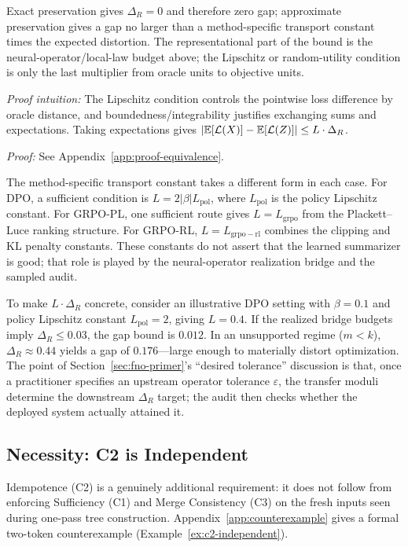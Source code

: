 \noindent Exact preservation gives $\Delta_R = 0$ and therefore zero gap; approximate preservation gives a gap no larger than a method-specific transport constant times the expected distortion. The representational part of the bound is the neural-operator/local-law budget above; the Lipschitz or random-utility condition is only the last multiplier from oracle units to objective units.

\noindent\textit{Proof intuition:} The Lipschitz condition controls the pointwise loss difference by oracle distance, and boundedness/integrability justifies exchanging sums and expectations. Taking expectations gives $|\mathbb{E}[\mathcal{L}(X)] - \mathbb{E}[\mathcal{L}(Z)]| \le L \cdot \Delta_R$.

\noindent\textit{Proof:} See Appendix~\ref{app:proof-equivalence}.

The method-specific transport constant takes a different form in each case. For DPO, a sufficient condition is $L = 2|\beta| L_{\mathrm{pol}}$, where $L_{\mathrm{pol}}$ is the policy Lipschitz constant. For GRPO-PL, one sufficient route gives $L = L_{\mathrm{grpo}}$ from the Plackett--Luce ranking structure. For GRPO-RL, $L = L_{\mathrm{grpo-rl}}$ combines the clipping and KL penalty constants. These constants do not assert that the learned summarizer is good; that role is played by the neural-operator realization bridge and the sampled audit.

To make $L \cdot \Delta_R$ concrete, consider an illustrative DPO
setting with $\beta = 0.1$ and policy Lipschitz constant
$L_{\mathrm{pol}} = 2$, giving $L = 0.4$. If the realized bridge
budgets imply $\Delta_R \le 0.03$, the gap bound is $0.012$. In an
unsupported regime ($m < k$), $\Delta_R \approx 0.44$ yields a gap of
$0.176$---large enough to materially distort optimization. The point of
Section~\ref{sec:fno-primer}'s ``desired tolerance'' discussion is that,
once a practitioner specifies an upstream operator tolerance
$\varepsilon$, the transfer moduli determine the downstream
$\Delta_R$ target; the audit then checks whether the deployed system
actually attained it.

\subsection{Necessity: C2 is Independent}

Idempotence (C2) is a genuinely additional requirement: it does not follow from enforcing Sufficiency (C1) and Merge Consistency (C3) on the fresh inputs seen during one-pass tree construction. Appendix~\ref{app:counterexample} gives a formal two-token counterexample (Example~\ref{ex:c2-independent}).


